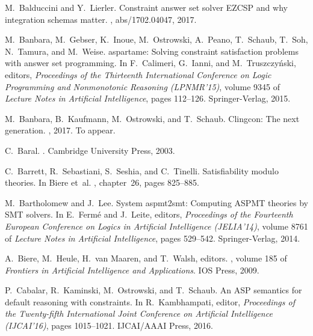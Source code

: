 \begin{thebibliography}{10}

M.~Balduccini and Y.~Lierler.
\newblock Constraint answer set solver {EZCSP} and why integration schemas
  matter.
, abs/1702.04047, 2017.

M.~Banbara, M.~Gebser, K.~Inoue, M.~Ostrowski, A.~Peano, T.~Schaub, T.~Soh,
  N.~Tamura, and M.~Weise.
\newblock aspartame: Solving constraint satisfaction problems with answer set
  programming.
\newblock In F.~Calimeri, G.~Ianni, and M.~Truszczy{\'n}ski, editors, {\em
  Proceedings of the Thirteenth International Conference on Logic Programming
  and Nonmonotonic Reasoning (LPNMR'15)}, volume 9345 of {\em Lecture Notes in
  Artificial Intelligence}, pages 112--126. Springer-Verlag, 2015.

M.~Banbara, B.~Kaufmann, M.~Ostrowski, and T.~Schaub.
\newblock Clingcon: The next generation.
, 2017.
\newblock To appear.

C.~Baral.
.
\newblock Cambridge University Press, 2003.

C.~Barrett, R.~Sebastiani, S.~Seshia, and C.~Tinelli.
\newblock Satisfiability modulo theories.
\newblock In Biere et~al. \cite{SATHandbook}, chapter~26, pages 825--885.

M.~Bartholomew and J.~Lee.
\newblock System aspmt2smt: Computing {ASPMT} theories by {SMT} solvers.
\newblock In E.~Ferm\'{e} and J.~Leite, editors, {\em Proceedings of the
  Fourteenth European Conference on Logics in Artificial Intelligence
  (JELIA'14)}, volume 8761 of {\em Lecture Notes in Artificial Intelligence},
  pages 529--542. Springer-Verlag, 2014.

A.~Biere, M.~Heule, H.~{van Maaren}, and T.~Walsh, editors.
, volume 185 of {\em Frontiers in
  Artificial Intelligence and Applications}.
\newblock IOS Press, 2009.

P.~Cabalar, R.~Kaminski, M.~Ostrowski, and T.~Schaub.
\newblock An {ASP} semantics for default reasoning with constraints.
\newblock In R.~Kambhampati, editor, {\em Proceedings of the Twenty-fifth
  International Joint Conference on Artificial Intelligence (IJCAI'16)}, pages
  1015--1021. IJCAI/AAAI Press, 2016.


\end{thebibliography}
